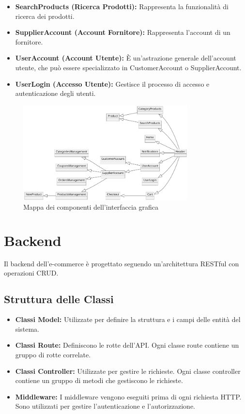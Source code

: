 \begin{itemize}
    \item \textbf{SearchProducts (Ricerca Prodotti):} Rappresenta la funzionalità di ricerca dei prodotti.
    \item \textbf{SupplierAccount (Account Fornitore):} Rappresenta l'account di un fornitore.
    \item \textbf{UserAccount (Account Utente):} È un'astrazione generale dell'account utente, che può essere specializzato in CustomerAccount o SupplierAccount.
    \item \textbf{UserLogin (Accesso Utente):} Gestisce il processo di accesso e autenticazione degli utenti.
\end{itemize}

\begin{figure}[H]
    \centering
    \includegraphics[width=0.8\textwidth]{figures/site-map.png}
    \caption{Mappa dei componenti dell'interfaccia grafica}
    \label{fig:site-map}
\end{figure}

\section{Backend}
Il backend dell'e-commerce è progettato seguendo un'architettura RESTful con operazioni CRUD.

\subsection{Struttura delle Classi}
\begin{itemize}
    \item \textbf{Classi Model:} Utilizzate per definire la struttura e i campi delle entità del sistema.
    \item \textbf{Classi Route:} Definiscono le rotte dell'API. Ogni classe route contiene un gruppo di rotte correlate.
    \item \textbf{Classi Controller:} Utilizzate per gestire le richieste. Ogni classe controller contiene un gruppo di metodi che gestiscono le richieste.
    \item \textbf{Middleware:} I middleware vengono eseguiti prima di ogni richiesta HTTP. Sono utilizzati per gestire l'autenticazione e l'autorizzazione.
\end{itemize}


